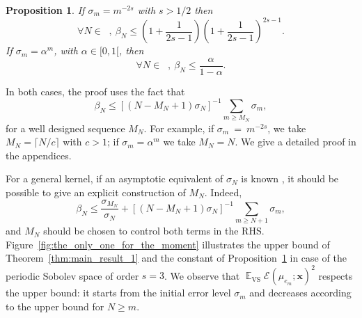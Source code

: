 \documentclass[twoside,11pt]{book}
\newtheorem{proposition}{Proposition}
\numberwithin{theorem}{chapter}
\numberwithin{definition}{chapter}
\numberwithin{proposition}{chapter}
\numberwithin{corollary}{chapter}
\numberwithin{example}{chapter}
\numberwithin{lemma}{chapter}
\DeclareMathOperator{\VS}{\mathrm{VS}}
\DeclareMathOperator{\EX}{\mathbb{E}}
\DeclareMathOperator{\Ns}{\mathbb{N}^{*}}
\begin{document}
\begin{proposition}\label{prop:constant_bound}
If $\sigma_{m} = m^{-2s}$ with $s >1/2$ then
\begin{equation}
\forall N \in \Ns, \: \beta_{N} \leq \left(1+\frac{1}{2s-1}\right)\left(1+\frac{1}{2s-1}\right)^{2s-1}.
\end{equation}
If $\sigma_{m} = \alpha^{m}$, with $\alpha \in [0,1[$, then
\begin{equation}
\forall N \in \Ns, \: \beta_{N} \leq \frac{\alpha}{1-\alpha}.
\end{equation}
\end{proposition}
In both cases, the proof uses the fact that
\begin{equation}
\beta_{N} \leq [(N-M_{N}+1)\sigma_N]^{-1} \sum_{m \geq M_{N}} \sigma_m,
\end{equation}
for a well designed sequence $M_{N}$. For example, if $\sigma_{m}~=~m^{-2s}$, we take $M_{N} = \lceil{N/c \rceil}$ with $c >1$; if $\sigma_{m} = \alpha^{m}$ we take $M_N = N$. We give a detailed proof in the appendices.

 For a general kernel, if an asymptotic equivalent of $\sigma_{N}$ is known \citep{Wid63,Wid64}, it should be possible to give an explicit construction of $M_N$. Indeed,
\begin{equation}
 \beta_{N} \leq \frac{\sigma_{M_{N}}}{\sigma_{N}} + [{(N-M_{N}+1)\sigma_{N}}]^{-1} \sum\limits_{m \geq N+1}\sigma_{m},
\end{equation}
and $M_{N}$ should be chosen to control both terms in the RHS.
%
Figure~\ref{fig:the_only_one_for_the_moment} illustrates the upper bound of Theorem~\ref{thm:main_result_1} and the constant of Proposition~\ref{prop:constant_bound} in case of the periodic Sobolev space of order $s=3$. We observe that $\EX_{\VS} \mathcal{E}(\mu_{e_m};\bm{x})^{2}$ respects the upper bound: it starts from the initial error level $\sigma_m$ and decreases according to the upper bound for $N \geq m$.
\end{document}
